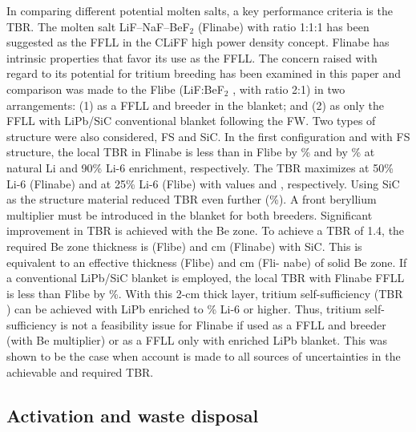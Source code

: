 In comparing different potential molten salts, a key performance criteria is
the \gls{TBR}.  The molten salt LiF--NaF--BeF$_2$ (Flinabe) with ratio 1:1:1 has
been suggested as the \gls{FFLL} in the \gls{CLiFF} high power density
concept. Flinabe has intrinsic properties that favor its use as the
\gls{FFLL}. The concern raised with regard to its potential for tritium
breeding has been examined in this paper and comparison was made to the Flibe
(LiF:BeF$_2$ , with ratio 2:1) in two arrangements: (1) as a \gls{FFLL} and
breeder in the blanket; and (2) as only the \gls{FFLL} with LiPb/SiC
conventional blanket following the \gls{FW}. Two types of structure were also
considered, \gls{FS} and SiC.  In the first configuration and with \gls{FS}
structure, the local \gls{TBR} in Flinabe is less than in Flibe by \% and by \% at natural Li and 90\% Li-6 enrichment,
respectively. The \gls{TBR} maximizes at 50\% Li-6 (Flinabe) and at 25\% Li-6
(Flibe) with values  and , respectively. Using
SiC as the structure material reduced \gls{TBR} even further (\%). A front beryllium multiplier must be introduced in the blanket for both
breeders.  Significant improvement in \gls{TBR} is achieved with the Be
zone. To achieve a \gls{TBR} of 1.4, the required Be zone thickness is
 (Flibe) and  cm (Flinabe) with SiC. This is
equivalent to an effective thickness  (Flibe) and 
cm (Fli- nabe) of solid Be zone. If a conventional LiPb/SiC blanket is
employed, the local \gls{TBR} with Flinabe \gls{FFLL} is less than Flibe by
\%. With this 2-cm thick layer, tritium self-sufficiency
(\gls{TBR} ) can be achieved with LiPb enriched to \% Li-6 or higher. Thus, tritium self-sufficiency is not a feasibility issue
for Flinabe if used as a \gls{FFLL} and breeder (with Be multiplier) or as a
\gls{FFLL} only with enriched LiPb blanket. This was shown to be the case when
account is made to all sources of uncertainties in the achievable and required
\gls{TBR}.

\subsection{Activation and waste disposal}

